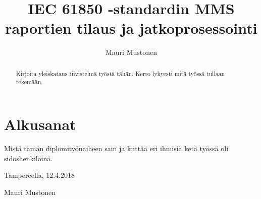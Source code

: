 \documentclass[globalnumbering,centeredcaptions,draftfooter]{tutthesis} %
\author{Mauri Mustonen}
\title{IEC 61850 -standardin MMS raportien tilaus ja jatkoprosessointi}
\begin{document}
\maketitle


\begin{abstract}
Kirjoita yleiskataus tiivistelmä työstä tähän. Kerro lyhyesti mitä työssä tullaan tekemään.
\end{abstract}


\iffalse
\begin{otherlanguage}{english}

\title{Tampere University of Technology thesis template}
\programme{...}
\thesisdescription{...}
\major{Mathematics}
\examiner{Professor Vilma Välkky\and Professor Matti Meikäläinen}
\keywords{thesis, template, thesis structure, thesis layout}

\begin{abstract}
The abstract is a self-contained, concise description of the thesis: what was the problem, what was done, what was the result.
Do not include charts or tables in the abstract.

First include the abstract written in the main language of the thesis and then the translation.
A bachelor's thesis in Finnish must also have a name in English for archival.
\end{abstract}
\end{otherlanguage}
\fi


\chapter*{Alkusanat}

Mistä tämän diplomityönaiheen sain ja kiittää eri ihmisiä ketä työssä oli sidoshenkilöinä.

\vspace{2\baselineskip}

Tampereella, 12.4.2018

\vspace{2\baselineskip}

Mauri Mustonen


\tableofcontents


\end{document}
